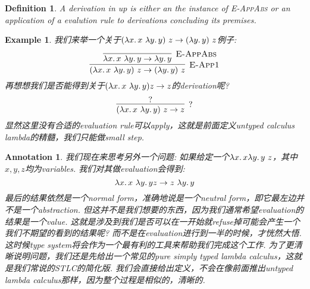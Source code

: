 \documentclass{article}
\newtheorem{example}[theorem]{Example}
\newtheorem{definition}[theorem]{Definition}
\newtheorem{annotation}[theorem]{Annotation}
\newcommand{\lam}[2]{\ensuremath{\lambda #1\ldotp #2}} %
\begin{document}
\begin{definition}
\rm A \emph{derivation} in up is either an the instance of \textsc{E-AppAbs} or an application of a evalution rule to derivations concluding its premises. 
\end{definition}

\begin{example}
\rm 我们来举一个关于$(\lam{x}{x}~\lam{y}{y})~z \to (\lam{y}{y})~z$例子:
\[
	\infer[\textsc{E-App1}]{(\lam{x}{x}~\lam{y}{y})~z \to (\lam{y}{y})~z}{\infer[\textsc{E-AppAbs}]{\lam{x}{x}~\lam{y}{y} \to \lam{y}{y}}{}}
\] 
再想想我们是否能得到关于$(\lam{x}{x}~\lam{y}{y}) z \to z$的derivation呢?
\[
	\infer[?]{(\lam{x}{x}~\lam{y}{y})~z \to z}{?}
\]
显然这里没有合适的evaluation rule可以apply，这就是前面定义untyped calculus lambda的精髓，我们只能做small step. 
\end{example}

\begin{annotation}
\rm 我们现在来思考另外一个问题: 如果给定一个$\lam{x}{x \lam{y}{y}}~z$，其中$x,y,z$均为variables. 我们对其做evaluation会得到:
\[
	\lam{x}{x~\lam{y}{y}} z \to z~\lam{y}{y} 
\]
最后的结果依然是一个normal form，准确地说是一个neutral form，即它最左边并不是一个abstraction. 但这并不是我们想要的东西，因为我们通常希望evaluation的结果是一个value. 这就是涉及到我们是否可以在一开始就refuse掉可能会产生一个我们不期望的看到的结果呢? 而不是在evaluation进行到一半的时候，才恍然大悟. 这时候type system将会作为一个最有利的工具来帮助我们完成这个工作. 为了更清晰说明问题，我们还是先给出一个常见的\emph{pure simply typed lambda calculus}，这就是我们常说的STLC的简化版. 我们会直接给出定义，不会在像前面推出untyped lambda calculus那样，因为整个过程是相似的，清晰的.  
\end{annotation}
\end{document}
